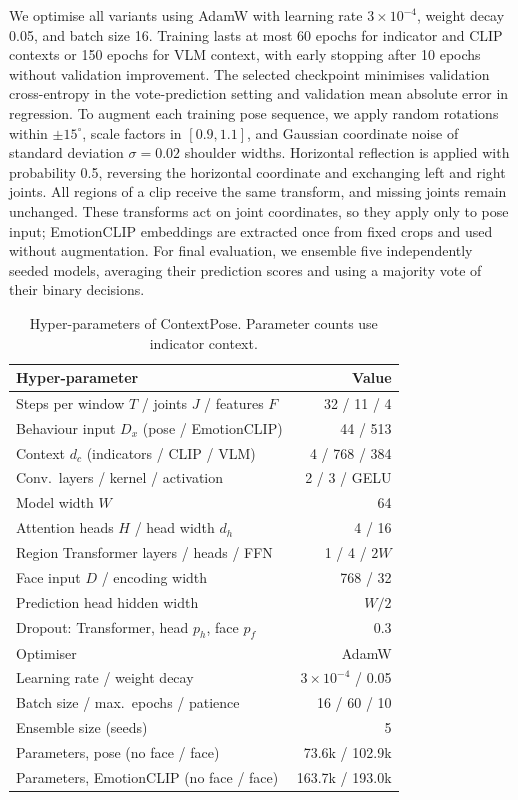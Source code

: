 \documentclass[11pt]{article}
\begin{document}
We optimise all variants using AdamW with learning rate $3\times10^{-4}$, weight decay 0.05, and batch size 16. Training lasts at most 60 epochs for indicator and CLIP contexts or 150 epochs for VLM context, with early stopping after 10 epochs without validation improvement. The selected checkpoint minimises validation cross-entropy in the vote-prediction setting and validation mean absolute error in regression. To augment each training pose sequence, we apply random rotations within $\pm15^\circ$, scale factors in $[0.9,1.1]$, and Gaussian coordinate noise of standard deviation $\sigma=0.02$ shoulder widths. Horizontal reflection is applied with probability 0.5, reversing the horizontal coordinate and exchanging left and right joints. All regions of a clip receive the same transform, and missing joints remain unchanged. These transforms act on joint coordinates, so they apply only to pose input; EmotionCLIP embeddings are extracted once from fixed crops and used without augmentation. For final evaluation, we ensemble five independently seeded models, averaging their prediction scores and using a majority vote of their binary decisions.

\begin{table}[t]
\centering
\caption{Hyper-parameters of ContextPose. Parameter counts use indicator context.}
\label{tab:hparams}
\footnotesize
\setlength{\tabcolsep}{4pt}
\begin{tabular}{@{}lr@{}}
\toprule
Hyper-parameter & Value \\
\midrule
Steps per window $T$ / joints $J$ / features $F$ & 32 / 11 / 4 \\
Behaviour input $D_x$ (pose / EmotionCLIP) & 44 / 513 \\
Context $d_c$ (indicators / CLIP / VLM) & 4 / 768 / 384 \\
Conv.\ layers / kernel / activation & 2 / 3 / GELU \\
Model width $W$ & 64 \\
Attention heads $H$ / head width $d_h$ & 4 / 16 \\
Region Transformer layers / heads / FFN & 1 / 4 / $2W$ \\
Face input $D$ / encoding width & 768 / 32 \\
Prediction head hidden width & $W/2$ \\
Dropout: Transformer, head $p_h$, face $p_f$ & 0.3 \\
\midrule
Optimiser & AdamW \\
Learning rate / weight decay & $3{\times}10^{-4}$ / 0.05 \\
Batch size / max.\ epochs / patience & 16 / 60 / 10 \\
Ensemble size (seeds) & 5 \\
\midrule
Parameters, pose (no face / face) & 73.6k / 102.9k \\
Parameters, EmotionCLIP (no face / face) & 163.7k / 193.0k \\
\bottomrule
\end{tabular}
\end{table}
\end{document}
